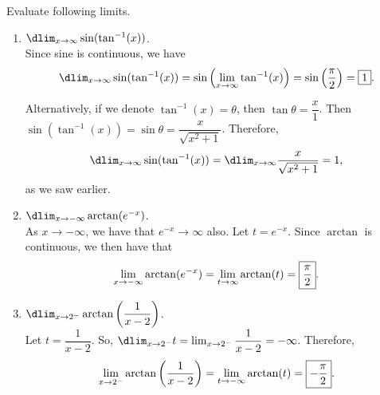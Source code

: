 \documentclass{book}
\begin{document}
\begin{Exam} Evaluate following limits.
\begin{enumerate}
\item $\dlim_{x\to \infty} \sin(\tan^{-1}(x))$.\\

Since sine is continuous, we have 
\[\dlim_{x\to \infty} \sin(\tan^{-1}(x)) = \sin\left(\lim_{x\to \infty} \tan^{-1}(x)\right) = \sin\left(\dfrac{\pi}{2}\right) = \fbox{$1$}.\]\vs

Alternatively, if we denote $\tan^{-1}(x) = \theta$, then $\tan \theta = \dfrac{x}{1}$. Then $\sin(\tan^{-1}(x)) = \sin\theta = \dfrac{x}{\sqrt{x^2+1}}$. Therefore, 
\[\dlim_{x\to \infty} \sin(\tan^{-1}(x)) = \dlim_{x\to \infty} \dfrac{x}{\sqrt{x^2+1}} = 1,\] as we saw earlier.\\

\item $\dlim_{x\to -\infty} \arctan(e^{-x})$.\\

As $x\to -\infty$, we have that $e^{-x}\to \infty$ also. Let $t = e^{-x}$. Since $\arctan$ is continuous, we then have that 
\[\lim_{x\to -\infty} \arctan(e^{-x}) = \lim_{t\to \infty} \arctan(t) = \fbox{$\dfrac{\pi}{2}$}.\]\vs

\item $\dlim_{x\to 2^-} \arctan\left(\dfrac{1}{x-2}\right)$.\\

Let $t = \dfrac{1}{x-2}$. So, $\dlim_{x\to 2^-} t = \lim_{x\to 2^-} \dfrac{1}{x-2} = -\infty$. Therefore, \[\lim_{x\to 2^-} \arctan\left(\dfrac{1}{x-2}\right) = \lim_{t\to -\infty} \arctan(t) = \fbox{$-\dfrac{\pi}{2}$}. \]
\end{enumerate}
\end{Exam}\vs

\vfill
{}
\pagebreak

\end{document}
